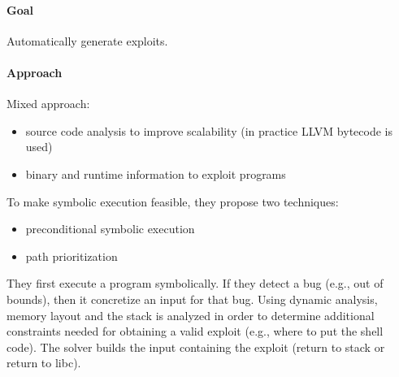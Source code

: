 \paragraph{Goal}
Automatically generate exploits.

\paragraph{Approach}

Mixed approach: 
\begin{itemize}
  \item source code analysis to improve scalability (in practice LLVM bytecode is used)
  \item binary and runtime information to exploit programs
\end{itemize}

To make symbolic execution feasible, they propose two techniques:
\begin{itemize}
  \item preconditional symbolic execution
  \item path prioritization
\end{itemize}

They first execute a program symbolically. If they detect a bug (e.g., out of bounds), then it concretize an input for that bug. Using dynamic analysis, memory layout and the stack is analyzed in order to determine additional constraints needed for obtaining a valid exploit (e.g., where to put the shell code). The solver builds the input containing the exploit (return to stack or return to libc).\\

